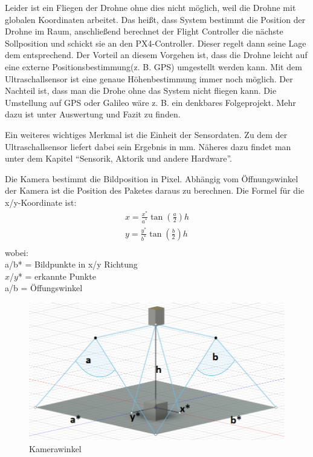 Leider ist ein Fliegen der Drohne ohne dies nicht möglich, weil die Drohne mit globalen Koordinaten arbeitet. Das heißt, dass System bestimmt die Position der Drohne im Raum, anschließend berechnet der Flight Controller die nächste Sollposition und schickt sie an den PX4-Controller. Dieser regelt dann seine Lage dem entsprechend. Der Vorteil an diesem Vorgehen ist, dass die Drohne leicht auf eine externe Positionsbestimmung(z. B. GPS) umgestellt werden kann. 
Mit dem Ultraschallsensor ist eine genaue Höhenbestimmung immer noch möglich. Der Nachteil ist, dass man die Drohe ohne das System nicht fliegen kann. Die Umstellung auf GPS oder Galileo wäre z. B. ein denkbares Folgeprojekt. Mehr dazu ist unter Auswertung und Fazit zu finden.

Ein weiteres wichtiges Merkmal ist die Einheit der Sensordaten. Zu dem der Ultraschallsensor liefert dabei sein Ergebnis in mm. Näheres dazu findet man unter dem Kapitel ``Sensorik, Aktorik und andere Hardware''.

Die Kamera bestimmt die Bildposition in Pixel. Abhängig vom Öffnungswinkel der Kamera ist die Position des Paketes daraus zu berechnen.
Die Formel für die x/y-Koordinate ist:
\begin{equation}
\begin{split}
x = \frac{x^*}{a^*} \tan(\frac{a}{2}) h\\
y = \frac{y^*}{b^*} \tan(\frac{b}{2}) h\\
\end{split}
\end{equation}
wobei:\\
a/b* = Bildpunkte in x/y Richtung\\
$x$/$y$* = erkannte Punkte\\
a/b = Öffungswinkel\\

\begin{figure}[h]
	\centering
	\includegraphics[scale=0.3]{"Grafiken/Kameraformel.png"}
	\caption{Kamerawinkel}
	\label{fig:kameraformel}
\end{figure}
